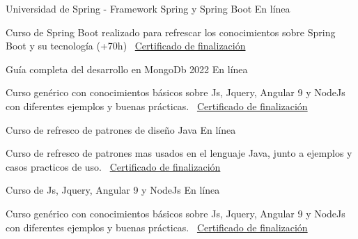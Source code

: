 \documentclass[]{awesome-cv}
\begin{document}
\begin{cventries}
	\cventry
	{}
	{Universidad de Spring - Framework Spring y Spring Boot \vspace{-4mm}}
	{En línea \vspace{-5mm}}
	{}
	{\begin{cvsectionnormaltext} 
		\item{Curso de Spring Boot realizado para refrescar los conocimientos sobre Spring Boot y su tecnología (+70h)
		\newline \vspace{2mm} \faLink\ \href{https://www.udemy.com/certificate/UC-ee0ce349-6915-479b-b038-5253aba9d0d8/}{Certificado de finalización}}
	\end{cvsectionnormaltext}}
    {}

	\cventry
	{}
	{Guía completa del desarrollo en MongoDb 2022 \vspace{-4mm}}
	{En línea \vspace{-5mm}}
	{}
	{\begin{cvsectionnormaltext} 
		\item{Curso genérico con conocimientos básicos sobre Js, Jquery, Angular 9 y NodeJs con diferentes ejemplos y buenas prácticas.
		\newline \vspace{2mm} \faLink\ \href{https://www.udemy.com/certificate/UC-b990e98a-9b76-44b1-8e3e-43b68213725c/}{Certificado de finalización}}
	\end{cvsectionnormaltext}}
    {}
    
	\cventry
	{}
	{Curso de refresco de patrones de diseño Java \vspace{-4mm}}
	{En línea \vspace{-5mm}}
	{}
	{\begin{cvsectionnormaltext} 
		\item{Curso de refresco de patrones mas usados en el lenguaje Java, junto a ejemplos y casos practicos de uso.
		\newline \vspace{2mm} \faLink\ \href{https://www.udemy.com/certificate/UC-982e3338-ea7d-4434-bf27-af8e38b77bd5/}{Certificado de finalización}}
	\end{cvsectionnormaltext}}
    {}

    
	\cventry
	{}
	{Curso de Js, Jquery, Angular 9 y NodeJs \vspace{-4mm}}
	{En línea \vspace{-5mm}}
	{}
	{\begin{cvsectionnormaltext} 
		\item{Curso genérico con conocimientos básicos sobre Js, Jquery, Angular 9 y NodeJs con diferentes ejemplos y buenas prácticas.
		\newline \vspace{2mm} \faLink\ \href{https://www.udemy.com/certificate/UC-012febdf-7657-4e65-8708-ee4e18d5a8e1/}{Certificado de finalización}}
	\end{cvsectionnormaltext}}
    {}
\end{cventries}
\end{document}
